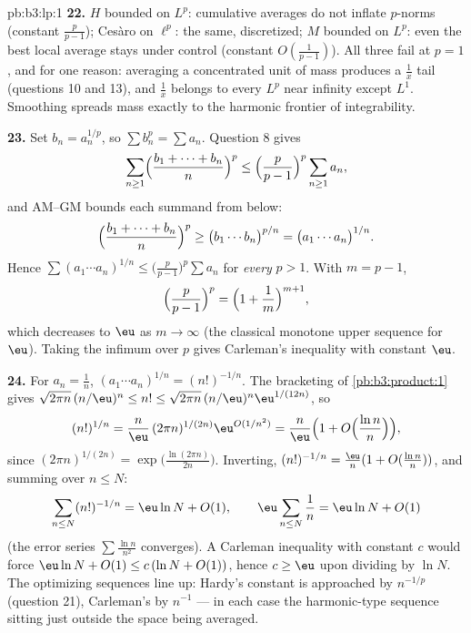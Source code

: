 \begin{solution}{pb:b3:lp:1}
\textbf{22.} $H$ bounded on $L^p$: cumulative averages do
not inflate $p$-norms (constant $\frac p{p-1}$); Ces\`aro on
$\ell^p$: the same, discretized; $M$ bounded on $L^p$: even
the best local average stays under control (constant
$O(\frac1{p-1})$). All three fail at $p = 1$, and for one
reason: averaging a concentrated unit of mass produces a
$\frac1x$ tail (questions 10 and 13), and $\frac1x$ belongs
to every $L^p$ near infinity except $L^1$. Smoothing spreads
mass exactly to the harmonic frontier of integrability.

\textbf{23.} Set $b_n = a_n^{1/p}$, so $\sum b_n^p = \sum
a_n$. Question 8 gives
\[
\sum_{n\geq1}\Bigl(\frac{b_1 + \dots + b_n}n\Bigr)^{p}
\leq \Bigl(\frac p{p-1}\Bigr)^{p}\sum_{n\geq1}a_n,
\]
and AM--GM bounds each summand from below:
\[
\Bigl(\frac{b_1 + \dots + b_n}n\Bigr)^{p}
\geq \bigl(b_1\cdots b_n\bigr)^{p/n}
= \bigl(a_1\cdots a_n\bigr)^{1/n}.
\]
Hence $\sum(a_1\cdots a_n)^{1/n} \leq \bigl(\frac
p{p-1}\bigr)^p\sum a_n$ for \emph{every} $p > 1$. With $m =
p - 1$,
\[
\Bigl(\frac p{p-1}\Bigr)^{p} =
\Bigl(1 + \frac1m\Bigr)^{m+1},
\]
which decreases to $\eu$ as $m \to \infty$ (the classical
monotone upper sequence for $\eu$). Taking the infimum over
$p$ gives Carleman's inequality with constant $\eu$.

\textbf{24.} For $a_n = \frac1n$, $(a_1\cdots a_n)^{1/n} =
(n!)^{-1/n}$. The bracketing of \cref{pb:b3:product:1} gives
$\sqrt{2\pi n}\,(n/\eu)^n \leq n! \leq \sqrt{2\pi
n}\,(n/\eu)^n\eu^{1/(12n)}$, so
\[
(n!)^{1/n} = \frac n\eu\,(2\pi n)^{1/(2n)}
\eu^{O(1/n^2)}
= \frac n\eu\Bigl(1 +
O\Bigl(\frac{\ln n}{n}\Bigr)\Bigr),
\]
since $(2\pi n)^{1/(2n)} = \exp\bigl(\frac{\ln(2\pi
n)}{2n}\bigr)$. Inverting, $(n!)^{-1/n} = \frac\eu n(1 +
O(\frac{\ln n}n))$, and summing over $n \leq N$:
\[
\sum_{n\leq N}(n!)^{-1/n}
= \eu\ln N + O(1),
\qquad
\eu\sum_{n\leq N}\frac1n = \eu\ln N + O(1)
\]
(the error series $\sum\frac{\ln n}{n^2}$ converges). A
Carleman inequality with constant $c$ would force $\eu\ln N
+ O(1) \leq c\,(\ln N + O(1))$, hence $c \geq \eu$ upon
dividing by $\ln N$. The optimizing sequences line up:
Hardy's constant is approached by $n^{-1/p}$ (question 21),
Carleman's by $n^{-1}$ --- in each case the harmonic-type
sequence sitting just outside the space being averaged.


\end{solution}
